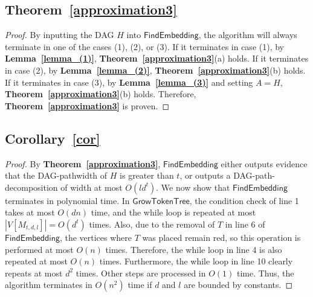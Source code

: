 \documentclass[runningheads]{llncs}
\theoremstyle{plain}
\theoremstyle{definition}
\begin{document}
\subsection{\textbf{Theorem~\ref{approximation3}}}\label{appendix_D8}
\begin{proof}
    By inputting the DAG $H$ into $\mathsf{FindEmbedding}$, the algorithm will always terminate in one of the cases (1), (2), or (3). If it terminates in case (1), by \textbf{Lemma~\ref{lemma_(1)}}, \textbf{Theorem~\ref{approximation3}}(a) holds. If it terminates in case (2), by \textbf{Lemma~\ref{lemma_(2)}}, \textbf{Theorem~\ref{approximation3}}(b) holds. If it terminates in case (3), by \textbf{Lemma~\ref{lemma_(3)}} and setting $A = H$, \textbf{Theorem~\ref{approximation3}}(b) holds. Therefore, \textbf{Theorem~\ref{approximation3}} is proven.
\end{proof}


\subsection{\textbf{Corollary~\ref{cor}}}\label{appendix_D9}
\begin{proof}
    By \textbf{Theorem~\ref{approximation3}}, $\mathsf{FindEmbedding}$ either outputs evidence that the DAG-pathwidth of $H$ is greater than $t$, or outputs a DAG-path-decomposition of width at most $O(ld^t)$. We now show that $\mathsf{FindEmbedding}$ terminates in polynomial time. In $\mathsf{GrowTokenTree}$, the condition check of line 1 takes at most $O(dn)$ time, and the while loop is repeated at most $|V[M_{t, d, l}]| = O(d^t)$ times. Also, due to the removal of $T$ in line 6 of $\mathsf{FindEmbedding}$, the vertices where $T$ was placed remain red, so this operation is performed at most $O(n)$ times. Therefore, the while loop in line 4 is also repeated at most $O(n)$ times. Furthermore, the while loop in line 10 clearly repeats at most $d^2$ times. Other steps are processed in $O(1)$ time. Thus, the algorithm terminates in $O(n^2)$ time if $d$ and $l$ are bounded by constants.
\end{proof}
\end{document}
